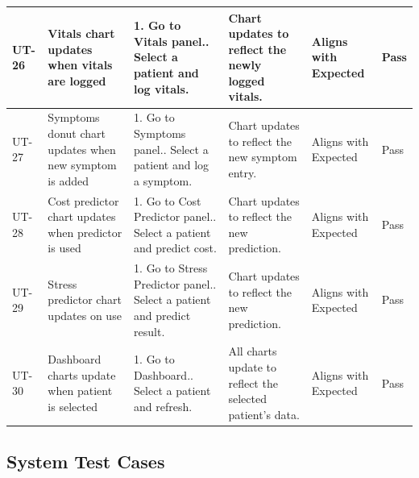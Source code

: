 \documentclass[12pt,a4paper]{article}
\begin{document}
\begin{longtable}{|p{1cm}|p{2.5cm}|p{3.5cm}|p{3.5cm}|p{2cm}|p{1.2cm}|}
    UT-26 & Vitals chart updates when vitals are logged &
        1. Go to Vitals panel.\newline
        2. Select a patient and log vitals. &
        Chart updates to reflect the newly logged vitals. &
        Aligns with Expected & Pass \\
    \hline
 
    UT-27 & Symptoms donut chart updates when new symptom is added &
        1. Go to Symptoms panel.\newline
        2. Select a patient and log a symptom. &
        Chart updates to reflect the new symptom entry. &
        Aligns with Expected & Pass \\
    \hline
 
    UT-28 & Cost predictor chart updates when predictor is used &
        1. Go to Cost Predictor panel.\newline
        2. Select a patient and predict cost. &
        Chart updates to reflect the new prediction. &
        Aligns with Expected & Pass \\
    \hline
 
    UT-29 & Stress predictor chart updates on use &
        1. Go to Stress Predictor panel.\newline
        2. Select a patient and predict result. &
        Chart updates to reflect the new prediction. &
        Aligns with Expected & Pass \\
    \hline
 
    UT-30 & Dashboard charts update when patient is selected &
        1. Go to Dashboard.\newline
        2. Select a patient and refresh. &
        All charts update to reflect the selected patient's data. &
        Aligns with Expected & Pass \\
    \hline
 
\end{longtable}
 
 
\subsection{System Test Cases}
 
\end{document}
